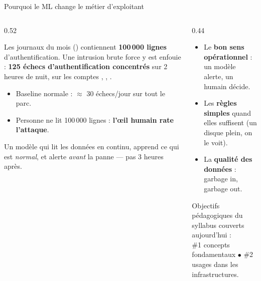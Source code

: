 \begin{frame}{Pourquoi le ML change le métier d'exploitant}
\begin{columns}[t]
\begin{column}{0.52\textwidth}
\begin{ebox}
Les journaux du mois () contiennent \textbf{100\,000 lignes}
d'authentification. Une intrusion brute force y est enfouie :
\textbf{125 échecs d'authentification concentrés} sur 2 heures de nuit,
sur les comptes , , .
\begin{itemize}
\item Baseline normale : $\approx$ 30 échecs/jour sur tout le parc.
\item Personne ne lit 100\,000 lignes : \textbf{l'œil humain rate l'attaque}.
\end{itemize}
\end{ebox}
\begin{kbox}
Un modèle qui lit les données en continu, apprend ce qui est \emph{normal},
et alerte \emph{avant} la panne --- pas 3 heures après.
\end{kbox}
\end{column}
\begin{column}{0.44\textwidth}
\begin{wbox}
\begin{itemize}
\item Le \textbf{bon sens opérationnel} : un modèle alerte, un humain décide.
\item Les \textbf{règles simples} quand elles suffisent (un disque plein, on le voit).
\item La \textbf{qualité des données} : garbage in, garbage out.
\end{itemize}
\end{wbox}
\vspace{2mm}
\begin{center}\small
Objectifs pédagogiques du syllabus couverts aujourd'hui :\\
\#1 concepts fondamentaux $\bullet$ \#2 usages dans les infrastructures.
\end{center}
\end{column}
\end{columns}
\end{frame}


